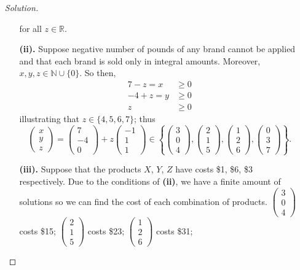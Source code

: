 \documentclass[ 12pt ]{article}
\begin{document}
\begin{enumerate}
\begin{proof}[Solution]
\begin{enumerate}
				for all $z \in \mathbb{R}$.
			\item[\textbf{(ii).}] Suppose negative number of pounds of any brand cannot be applied and that each brand is sold only in integral amounts. Moreover,
				$x, y, z \in \mathbb{N} \cup \{ 0 \}$. So then,
				\begin{align*}
					7-z=x &\geq 0 \\
					-4+z=y &\geq 0 \\
					z &\geq 0
				\end{align*}
				illustrating that $z \in \{ 4, 5, 6, 7 \}$; thus $$\begin{pmatrix} x \\ y \\ z \end{pmatrix}  = \begin{pmatrix} 7 \\ -4 \\ 0 \end{pmatrix} +
				z\begin{pmatrix} -1 \\ 1 \\ 1 \end{pmatrix} \in \left \{ \begin{pmatrix} 3 \\ 0 \\ 4 \end{pmatrix}, \begin{pmatrix} 2 \\ 1 \\ 5 \end{pmatrix},
				\begin{pmatrix} 1 \\ 2 \\ 6 \end{pmatrix}, \begin{pmatrix} 0 \\ 3 \\ 7 \end{pmatrix} \right \}.$$
			\item[\textbf{(iii).}] Suppose that the products $X$, $Y$, $Z$ have costs \$1, \$6, \$3 respectively. Due to the conditions of \textbf{(ii)}, we have a finite
				amount of solutions so we can find the cost of each combination of products. $\left(\begin{smallmatrix} 3 \\ 0 \\ 4 \end{smallmatrix}\right)$ costs \$15;
				$\left(\begin{smallmatrix} 2 \\ 1 \\ 5 \end{smallmatrix}\right)$ costs \$23; $\left(\begin{smallmatrix} 1 \\ 2 \\ 6 \end{smallmatrix}\right)$ costs \$31;

\end{enumerate}
\end{proof}
\end{enumerate}
\end{document}
